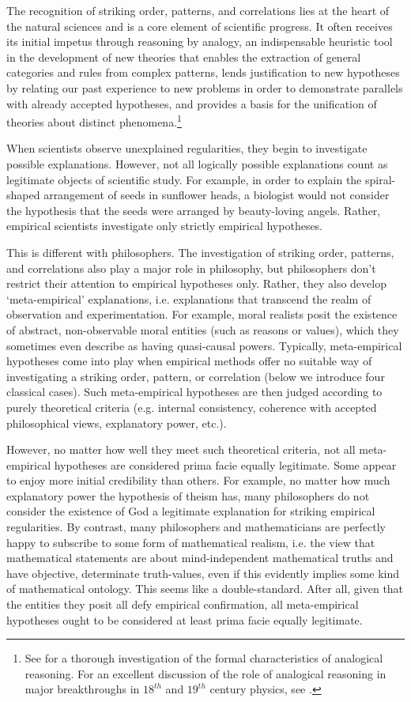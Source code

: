 \documentclass[a4paper,12pt]{article}
\begin{document}
The recognition of striking order, patterns, and correlations lies at the heart of the natural sciences and is a core element of scientific progress. It often receives its initial impetus through reasoning by analogy, an indispensable heuristic tool in the development of new theories that enables the extraction of general categories and rules from complex patterns, lends justification to new hypotheses by relating our past experience to new problems in order to demonstrate parallels with already accepted hypotheses, and provides a basis for the unification of theories about distinct phenomena.\footnote{See \cite{Bartha2010} for a thorough investigation of the formal characteristics of analogical reasoning. For an excellent discussion of the role of analogical reasoning in major breakthroughs in $18^{th}$ and $19^{th}$ century physics, see \cite{Steiner1989,Steiner1998}.}

When scientists observe unexplained regularities, they begin to investigate possible explanations. However, not all logically possible explanations count as legitimate objects of scientific study. For example, in order to explain the spiral-shaped arrangement of seeds in sunflower heads, a biologist would not consider the hypothesis that the seeds were arranged by beauty-loving angels. Rather, empirical scientists investigate only strictly empirical hypotheses.

This is different with philosophers. The investigation of striking order, patterns, and correlations also play a major role in philosophy, but philosophers don't restrict their attention to empirical hypotheses only. Rather, they also develop `meta-empirical' explanations, i.e. explanations that transcend the realm of observation and experimentation. For example, moral realists posit the existence of abstract, non-observable moral entities (such as reasons or values), which they sometimes even describe as having quasi-causal powers. Typically, meta-empirical hypotheses come into play when empirical methods offer no suitable way of investigating a striking order, pattern, or correlation (below we introduce four classical cases). Such meta-empirical hypotheses are then judged according to purely theoretical criteria (e.g. internal consistency, coherence with accepted philosophical views, explanatory power, etc.).

However, no matter how well they meet such theoretical criteria, not all meta-empirical hypotheses are considered prima facie equally legitimate. Some appear to enjoy more initial credibility than others. For example, no matter how much explanatory power the hypothesis of theism has, many philosophers do not consider the existence of God a legitimate explanation for striking empirical regularities. By contrast, many philosophers and mathematicians are perfectly happy to subscribe to some form of mathematical realism, i.e. the view that mathematical statements are about mind-independent mathematical truths and have objective, determinate truth-values, even if this evidently implies some kind of mathematical ontology. This seems like a double-standard. After all, given that the entities they posit all defy empirical confirmation, all meta-empirical hypotheses ought to be considered at least prima facie equally legitimate.
\end{document}
